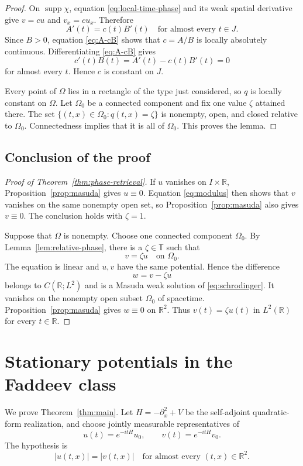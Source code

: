 \documentclass[11pt]{amsart}
\numberwithin{equation}{section}
\theoremstyle{remark}
\newcommand{\R}{\mathbb R}
\newcommand{\T}{\mathbb T}
\newcommand{\supp}{\operatorname{supp}}
\begin{document}
\begin{proof}
On $\supp\chi$, equation \eqref{eq:local-time-phase} and its weak spatial
derivative give $v=cu$ and $v_x=cu_x$.  Therefore
\[
 A'(t)=c(t)B'(t)
 \quad\text{for almost every }t\in J.
\]
Since $B>0$, equation \eqref{eq:A-cB} shows that $c=A/B$ is locally
absolutely continuous.  Differentiating \eqref{eq:A-cB} gives
\[
 c'(t)B(t)=A'(t)-c(t)B'(t)=0
\]
for almost every $t$.  Hence $c$ is constant on $J$.

Every point of $\Omega$ lies in a rectangle of the type just considered, so
$q$ is locally constant on $\Omega$.  Let $\Omega_0$ be a connected
component and fix one value $\zeta$ attained there.  The set
$\{(t,x)\in\Omega_0:q(t,x)=\zeta\}$ is nonempty, open, and closed relative to
$\Omega_0$.  Connectedness implies that it is all of $\Omega_0$.  This proves
the lemma.
\end{proof}

\subsection{Conclusion of the proof}

\begin{proof}[Proof of Theorem~\ref{thm:phase-retrieval}]
If $u$ vanishes on $I\times\R$, Proposition~\ref{prop:masuda} gives
$u\equiv0$.  Equation \eqref{eq:modulus} then shows that $v$ vanishes on the
same nonempty open set, so Proposition~\ref{prop:masuda} also gives
$v\equiv0$.  The conclusion holds with $\zeta=1$.

Suppose that $\Omega$ is nonempty.  Choose one connected component
$\Omega_0$.  By Lemma~\ref{lem:relative-phase}, there is a $\zeta\in\T$ such
that
\[
 v=\zeta u\quad\text{on }\Omega_0.
\]
The equation is linear and $u,v$ have the same potential.  Hence the
difference
\[
 w=v-\zeta u
\]
belongs to $C(\R;L^2)$ and is a Masuda weak solution of
\eqref{eq:schrodinger}.  It vanishes on the nonempty open subset
$\Omega_0$ of spacetime.  Proposition~\ref{prop:masuda} gives
$w\equiv0$ on $\R^2$.  Thus
$v(t)=\zeta u(t)$ in $L^2(\R)$ for every $t\in\R$.
\end{proof}


\section{Stationary potentials in the Faddeev class}\label{sec:faddeev}

We prove Theorem~\ref{thm:main}.  Let $H=-\partial_x^2+V$ be the
self-adjoint quadratic-form realization, and choose jointly measurable
representatives of
\[
 u(t)=e^{-itH}u_0,
 \qquad
 v(t)=e^{-itH}v_0.
\]
The hypothesis is
\begin{equation}
 |u(t,x)|=|v(t,x)|
 \quad\text{for almost every $(t,x)\in\R^2$}.
 \label{eq:modulus-hypothesis}
\end{equation}
\end{document}

